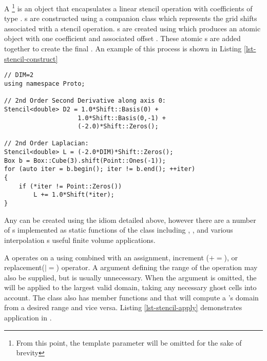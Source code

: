 \documentclass[12pt]{article}
\begin{document}
A \footnote{From this point, the template parameter  will be omitted for the sake of brevity} is an object that encapsulates a linear stencil operation with coefficients of type . s are constructed using a companion class  which represents the grid shifts associated with a stencil operation. s are created using  which produces an atomic  object with one coefficient  and associated offset . These atomic s are added together to create the final . An example of this process is shown in Listing \ref{lst-stencil-construct}

\begin{lstlisting}[caption=Stencil Construction, label=lst-stencil-construct]
// DIM=2
using namespace Proto;

// 2nd Order Second Derivative along axis 0:
Stencil<double> D2 = 1.0*Shift::Basis(0) +
					1.0*Shift::Basis(0,-1) +
					(-2.0)*Shift::Zeros();

// 2nd Order Laplacian:
Stencil<double> L = (-2.0*DIM)*Shift::Zeros();
Box b = Box::Cube(3).shift(Point::Ones(-1));
for (auto iter = b.begin(); iter != b.end(); ++iter)
{
	if (*iter != Point::Zeros())
		L += 1.0*Shift(*iter);
}
\end{lstlisting}
Any  can be created using the idiom detailed above, however there are a number of s implemented as static functions of the class  including , , and various interpolation s useful finite volume applications.

A  operates on a  using  combined with an assignment, increment ($+=$), or replacement($|=$) operator. A  argument defining the range of the operation may also be supplied, but is usually unnecessary. When the  argument is omitted, the  will be applied to the largest valid domain, taking any necessary ghost cells into account. The  class also has member functions  and  that will compute a 's domain from  a desired range and vice versa. Listing \ref{lst-stencil-apply} demonstrates  application in \libname .
\end{document}

